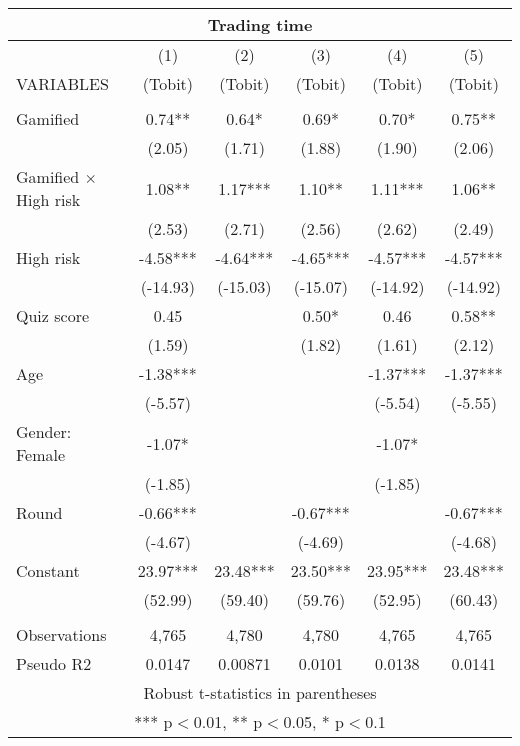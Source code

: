 \documentclass[]{article}
\begin{document}
\begin{tabular}{lccccc}
\multicolumn{6}{c}{Trading time} \\ \hline
 & (1) & (2) & (3) & (4) & (5) \\
VARIABLES & (Tobit) & (Tobit) & (Tobit) & (Tobit) & (Tobit) \\ \hline
 &  &  &  &  &  \\
Gamified & 0.74** & 0.64* & 0.69* & 0.70* & 0.75** \\
 & (2.05) & (1.71) & (1.88) & (1.90) & (2.06) \\
Gamified $\times$ High risk & 1.08** & 1.17*** & 1.10** & 1.11*** & 1.06** \\
 & (2.53) & (2.71) & (2.56) & (2.62) & (2.49) \\
High risk & -4.58*** & -4.64*** & -4.65*** & -4.57*** & -4.57*** \\
 & (-14.93) & (-15.03) & (-15.07) & (-14.92) & (-14.92) \\
Quiz score & 0.45 &  & 0.50* & 0.46 & 0.58** \\
 & (1.59) &  & (1.82) & (1.61) & (2.12) \\
Age & -1.38*** &  &  & -1.37*** & -1.37*** \\
 & (-5.57) &  &  & (-5.54) & (-5.55) \\
Gender: Female & -1.07* &  &  & -1.07* &  \\
 & (-1.85) &  &  & (-1.85) &  \\
Round & -0.66*** &  & -0.67*** &  & -0.67*** \\
 & (-4.67) &  & (-4.69) &  & (-4.68) \\
Constant & 23.97*** & 23.48*** & 23.50*** & 23.95*** & 23.48*** \\
 & (52.99) & (59.40) & (59.76) & (52.95) & (60.43) \\
 &  &  &  &  &  \\
Observations & 4,765 & 4,780 & 4,780 & 4,765 & 4,765 \\
 Pseudo R2 & 0.0147 & 0.00871 & 0.0101 & 0.0138 & 0.0141 \\ \hline
\multicolumn{6}{c}{ Robust t-statistics in parentheses} \\
\multicolumn{6}{c}{ *** p$<$0.01, ** p$<$0.05, * p$<$0.1} \\
\end{tabular}
\end{document}
